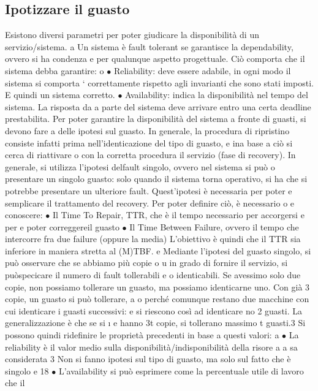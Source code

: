 \documentclass[a4paper,12pt]{article}
\begin{document}
\subsection{Ipotizzare il guasto}
Esistono diversi parametri per poter giudicare la disponibilità di un servizio/sistema.
a
Un sistema è fault tolerant se garantisce la dependability, ovvero si ha condenza
e
per qualunque aspetto progettuale. Ciò comporta che il sistema debba garantire:
o
$\bullet$ Reliability: deve essere adabile, in ogni modo il sistema si comporta
`
correttamente rispetto agli invarianti che sono stati imposti. E quindi un
sistema corretto.
$\bullet$ Availability: indica la disponibilità nel tempo del sistema. La risposta da
a
parte del sistema deve arrivare entro una certa deadline prestabilita.
Per poter garantire la disponibilità del sistema a fronte di guasti, si devono fare
a
delle ipotesi sul guasto. In generale, la procedura di ripristino consiste infatti
prima nell'identicazione del tipo di guasto, e ina base a ciò si cerca di riattivare
o
con la corretta procedura il servizio (fase di recovery).
In generale, si utilizza l'ipotesi delfault singolo, ovvero nel sistema si può
o
presentare un singolo guasto: solo quando il sistema torna operativo, si ha che
si potrebbe presentare un ulteriore fault. Quest'ipotesi è necessaria per poter
e
semplicare il trattamento del recovery. Per poter definire ciò, è necessario
o e
conoscere:
$\bullet$ Il Time To Repair, TTR, che è il tempo necessario per accorgersi e per
e
poter correggereil guasto
$\bullet$ Il Time Between Failure, ovvero il tempo che intercorre fra due failure
(oppure la media)
L'obiettivo è quindi che il TTR sia inferiore in maniera stretta al (M)TBF.
e
Mediante l'ipotesi del guasto singolo, si può osservare che se abbiamo più copie
o
u
in grado di fornire il servizio, si puòspecicare il numero di fault tollerabili e
o
identicabili. Se avessimo solo due copie, non possiamo tollerare un guasto,
ma possiamo identicarne uno. Con già 3 copie, un guasto si può tollerare,
a
o
perché comunque restano due macchine con cui identicare i guasti successivi:
e
si riescono così ad identicare no 2 guasti. La generalizzazione è che se si
\i{}
e
hanno 3t copie, si tollerano massimo t guasti.3 Si possono quindi ridefinire le
proprietà precedenti in base a questi valori:
a
$\bullet$ La reliability è il valor medio sulla disponibilità/indisponibilità della risore
a
a
sa considerata
3 Non
si fanno ipotesi sul tipo di guasto, ma solo sul fatto che è singolo
e
18
$\bullet$ L'availability si può esprimere come la percentuale utile di lavoro che il
\end{document}
